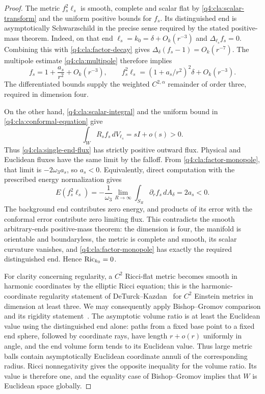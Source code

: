 \begin{proof}
The metric $f_s^2\ell_s$ is smooth, complete and scalar flat by
\eqref{q4:cla:scalar-transform} and the uniform positive bounds for
$f_s$.  Its distinguished end is asymptotically Schwarzschild in
the precise sense required by the stated positive-mass theorem.
Indeed, on that end $\ell_s=k_0=\delta+O_k(r^{-3})$ and
$\Delta_{\ell_s}f_s=0$.  Combining this with
\eqref{q4:cla:factor-decay} gives
$\Delta_\delta(f_s-1)=O_k(r^{-7})$.
The multipole estimate \eqref{q4:cla:multipole} therefore implies
\begin{equation}\label{q4:cla:factor-monopole}
 f_s=1+\frac{a_s}{r^2}+O_k(r^{-3}),\qquad
 f_s^2\ell_s=(1+a_s/r^2)^2\delta+O_k(r^{-3}).
\end{equation}
The differentiated bounds supply the weighted $C^{2,\alpha}$
remainder of order three, required in dimension four.

On the other hand, \eqref{q4:cla:scalar-integral} and the uniform
bound in \eqref{q4:cla:conformal-equation} give
\[
 \int_W R_sf_s\,dV_{\ell_s}=sI+o(s)>0.
\]
Thus \eqref{q4:cla:single-end-flux} has strictly positive outward
flux.  Physical and Euclidean fluxes have the same limit by the
falloff.  From \eqref{q4:cla:factor-monopole}, that limit is
$-2\omega_3a_s$, so $a_s<0$.  Equivalently, direct computation with
the prescribed energy normalization gives
\begin{equation}\label{q4:cla:negative-mass}
 E(f_s^2\ell_s)
   =-\frac1{\omega_3}
        \lim_{R\to\infty}\int_{S_R}\partial_r f_s\,dA_\delta
   =2a_s<0.
\end{equation}
The background end contributes zero energy, and products of its
error with the conformal error contribute zero limiting flux.
This contradicts the smooth arbitrary-ends positive-mass theorem:
the dimension is four, the manifold is orientable and boundaryless,
the metric is complete and smooth, its scalar curvature vanishes,
and \eqref{q4:cla:factor-monopole} has exactly the required distinguished
end.  Hence $\operatorname{Ric}_{k_0}=0$.

For clarity concerning regularity, a $C^2$ Ricci-flat metric becomes
smooth in harmonic coordinates by the elliptic Ricci equation;
this is the harmonic-coordinate regularity statement of
DeTurck--Kazdan~\cite[Theorem~5.2]{DeTurckKazdan1981} for $C^2$ Einstein
metrics in dimension at least three.
We may consequently apply Bishop--Gromov comparison and its
rigidity statement~\cite{Petersen2016}.  The asymptotic volume ratio
is at least the Euclidean value using the distinguished end alone:
paths from a fixed base point to a fixed end sphere, followed by
coordinate rays, have length $r+o(r)$ uniformly in angle, and the
end volume form tends to its Euclidean value.  Thus large metric
balls contain asymptotically Euclidean coordinate annuli of the
corresponding radius.  Ricci nonnegativity gives the opposite
inequality for the volume ratio.  Its value is therefore one, and
the equality case of Bishop--Gromov implies that $W$ is Euclidean
space globally.


\end{proof}
